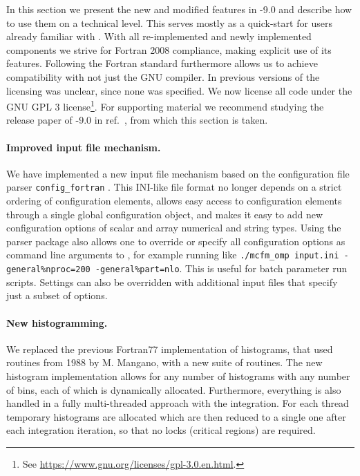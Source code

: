 In this section we present the new and modified features in \MCFM{}-9.0 and describe how to use them on a technical 
level. This serves mostly as a quick-start for users already familiar with \MCFM{}. With all re-implemented and newly 
implemented components we strive for Fortran 2008 compliance, making explicit 
use of its features. Following the Fortran standard furthermore allows us to achieve compatibility with not just the 
GNU compiler. In previous versions of \MCFM{} the licensing was unclear, since none was specified. We now license all 
code under the GNU GPL 3 license\footnote{See \url{https://www.gnu.org/licenses/gpl-3.0.en.html}.}. For supporting 
material we recommend studying the release paper of \MCFM{}-9.0 in ref.~\cite{MCFM9}, from which this section is taken.

\paragraph{Improved input file mechanism.}

We have implemented a new input file mechanism based on the configuration file parser \texttt{config\_fortran} 
\cite{JTeunis}.
This INI-like file format no longer depends on a strict ordering of configuration elements, allows easy access to
configuration elements through a single global configuration object, and makes it easy to add new configuration
options of scalar and array numerical and string types. Using the parser package also allows one
to override or specify all configuration options as command line arguments to \MCFM{}, for example running
\MCFM{} like \texttt{./mcfm\_omp input.ini -general\%nproc=200 -general\%part=nlo}. This is useful for batch
parameter run scripts. Settings can also be overridden with additional input files that specify just a subset of 
options.

\paragraph{New histogramming.}

We replaced the previous Fortran77 implementation of histograms, that used routines from 1988 by M. Mangano,
with a new suite of routines.
The new histogram implementation allows for any number of histograms with any number of bins,
each of which is dynamically allocated. Furthermore, everything is also handled in a fully multi-threaded approach with 
the integration. For each \OMP{} thread temporary 
histograms are allocated which are then reduced to a single one after each integration iteration, so that
no \OMP{} locks (critical regions) are required. 

